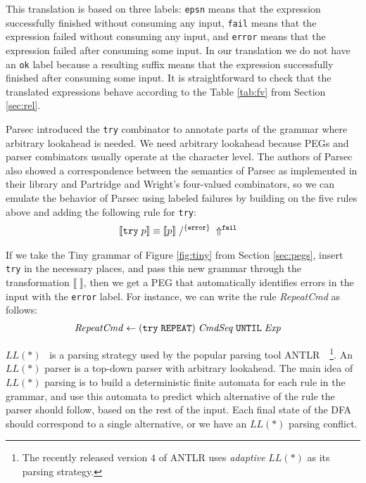 \documentclass[3p,12pt,singlecolumn]{elsarticle}
\newcommand{\throw}{\Uparrow}
\begin{document}
This translation is based on three labels:
\texttt{epsn} means that the expression successfully finished
without consuming any input,
\texttt{fail} means that the expression failed without consuming
any input,
and \texttt{error} means that the expression failed after
consuming some input.
In our translation we do not have an \texttt{ok} label because a
resulting suffix means that the expression successfully finished
after consuming some input.
It is straightforward to check that the translated expressions
behave according to the Table \ref{tab:fv} from Section \ref{sec:rel}.

Parsec introduced the \texttt{try} combinator to annotate parts of the
grammar where arbitrary lookahead is needed.
We need arbitrary lookahead because PEGs and parser combinators usually
operate at the character level.
The authors of Parsec also showed a correspondence between the semantics
of Parsec as implemented in their library and Partridge and Wright's
four-valued combinators,
so we can emulate the behavior of Parsec using labeled failures by
building on the five rules above and adding the following rule for
\texttt{try}:
\begin{align}
\label{fv:try}
\llbracket {\tt try} \; p \rrbracket & \equiv
\llbracket p \rrbracket \; /^{\{{\tt error}\}} \; \throw^{\tt fail}
\end{align}

If we take the Tiny grammar of Figure \ref{fig:tiny} from
Section \ref{sec:pegs}, insert \texttt{try} in the necessary places,
and pass this new grammar through the transformation
$\llbracket\;\rrbracket$, then we get a PEG that automatically
identifies errors in the input with the \texttt{error} label.
For instance, we can write the rule \textit{RepeatCmd} as follows:
\begin{align*}
\it{RepeatCmd} & \leftarrow \it{({\tt try \; REPEAT}) \; CmdSeq \;
  {\tt UNTIL} \; Exp}
\end{align*}

$LL(*)$~\cite{parr2011llstar} is a parsing strategy used by
the popular parsing tool ANTLR~\cite{parr2013antlr,antlrsite}~\footnote{The
recently released version $4$ of ANTLR uses {\em adaptive}
 $LL(*)$
as its parsing strategy.}. An $LL(*)$ parser is a top-down
parser with arbitrary lookahead. The main idea of $LL(*)$
parsing is to build a deterministic finite automata for
each rule in the grammar, and use this automata to predict
which alternative of the rule the parser should follow,
based on the rest of the input. Each final state of
the DFA should correspond to a single alternative, or
we have an $LL(*)$ parsing conflict. 
\end{document}

